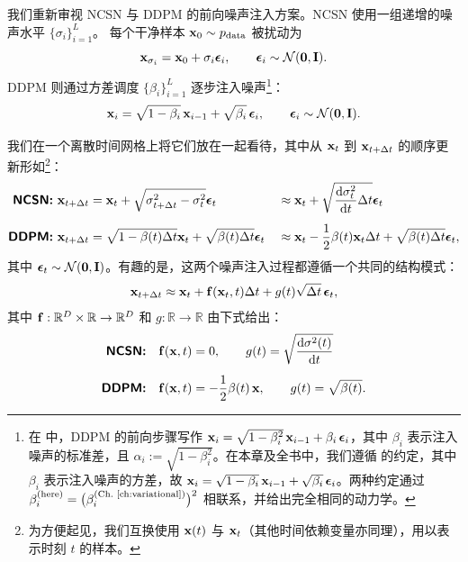 我们重新审视 NCSN 与 DDPM 的前向噪声注入方案。NCSN 使用一组递增的噪声水平 $\{\sigma_i\}_{i=1}^L$。
每个干净样本 ${\mathbf{x}}_0 \sim p_{\mathrm{data}}$ 被扰动为
\[
{\mathbf{x}}_{\sigma_i} = {\mathbf{x}}_0 + \sigma_i \bm{\epsilon}_i, 
\qquad \bm{\epsilon}_i \sim \mathcal{N}(\bm{0}, {\mathbf{I}}).
\]
DDPM 则通过方差调度 $\{\beta_i\}_{i=1}^L$ 逐步注入噪声\footnote{在  中，DDPM 的前向步骤写作 ${\mathbf{x}}_i = \sqrt{1-\beta_i^2}\,{\mathbf{x}}_{i-1} + \beta_i\,\bm{\epsilon}_i$，其中 $\beta_i$ 表示注入噪声的标准差，且 $\alpha_i := \sqrt{1-\beta_i^2}$。在本章及全书中，我们遵循 \citet{song2020score} 的约定，其中 $\beta_i$ 表示注入噪声的方差，故 ${\mathbf{x}}_i = \sqrt{1-\beta_i}\,{\mathbf{x}}_{i-1} + \sqrt{\beta_i}\,\bm{\epsilon}_i$。两种约定通过 $\beta_i^{\textup{(here)}} = \bigl(\beta_i^{\textup{(Ch.\ \ref{ch:variational})}}\bigr)^2$ 相联系，并给出完全相同的动力学。}：
\[
{\mathbf{x}}_i = \sqrt{1 - \beta_i}\, {\mathbf{x}}_{i-1} + \sqrt{\beta_i}\, \bm{\epsilon}_i, 
\qquad \bm{\epsilon}_i \sim \mathcal{N}(\bm{0}, {\mathbf{I}}).
\]

我们在一个离散时间网格上将它们放在一起看待，其中从 ${\mathbf{x}}_t$ 到 ${\mathbf{x}}_{t+\Delta t}$ 的顺序更新形如\footnote{为方便起见，我们互换使用 ${\mathbf{x}}(t)$ 与 ${\mathbf{x}}_t$（其他时间依赖变量亦同理），用以表示时刻 $t$ 的样本。}：
\begin{align*}
    \text{{\sffamily\textbf{NCSN:}}} \,\,
    & {\mathbf{x}}_{t+\Delta t} = {\mathbf{x}}_t + \sqrt{\sigma_{t+\Delta t}^2 - \sigma_t^2} \bm{\epsilon}_t 
    &&\approx {\mathbf{x}}_t + \sqrt{\frac{\mathop{}\!\mathrm{d} \sigma_t^2}{\mathop{}\!\mathrm{d} t} \Delta t}  \bm{\epsilon}_t \\[0.5em]
    \text{{\sffamily\textbf{DDPM:}}} \,\,
    & {\mathbf{x}}_{t+\Delta t} = \sqrt{1 - \beta(t)\Delta t} {\mathbf{x}}_t + \sqrt{\beta(t)\Delta t} \bm{\epsilon}_t 
    &&\approx {\mathbf{x}}_t - \frac{1}{2} \beta(t) {\mathbf{x}}_t  \Delta t + \sqrt{\beta(t)\Delta t}  \bm{\epsilon}_t,
\end{align*}
其中 $\bm{\epsilon}_t \sim \mathcal{N}(\bm{0}, {\mathbf{I}})$。有趣的是，这两个噪声注入过程都遵循一个共同的结构模式：
\begin{align}\label{eq:euler-discrete-sde}
    {\mathbf{x}}_{t+\Delta t} \approx {\mathbf{x}}_t + {\mathbf{f}}({\mathbf{x}}_t, t) \Delta t + g(t) \sqrt{\Delta t}\, \bm{\epsilon}_t,
\end{align}
其中 ${\mathbf{f}}: \mathbb{R}^D \times \mathbb{R} \to \mathbb{R}^D$ 和 $g: \mathbb{R} \to \mathbb{R}$ 由下式给出：
\begin{align*}
    \text{{\sffamily\textbf{NCSN:}}} \quad 
    & {\mathbf{f}}({\mathbf{x}}, t) = 0, \qquad g(t) = \sqrt{\frac{\mathop{}\!\mathrm{d} \sigma^2(t)}{\mathop{}\!\mathrm{d} t}} \\[0.5em]
    \text{{\sffamily\textbf{DDPM:}}} \quad 
    & {\mathbf{f}}({\mathbf{x}}, t) = -\frac{1}{2} \beta(t)\, {\mathbf{x}}, \qquad g(t) = \sqrt{\beta(t)}.
\end{align*}


